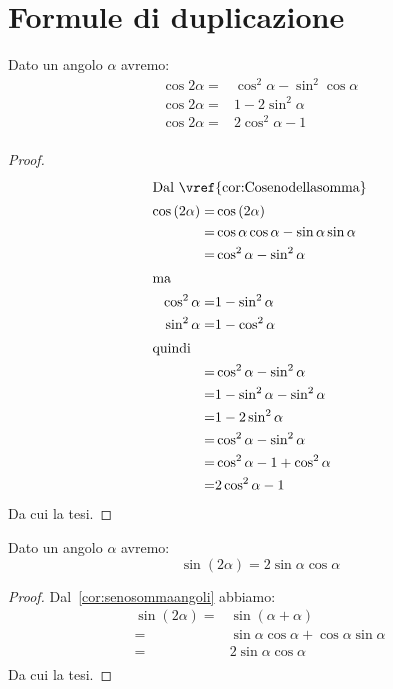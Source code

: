 \section{Formule di duplicazione}
\begin{thm}\label{thm:Formulediduplicazionecoseno}
Dato un angolo $\alpha$ avremo:
\begin{align*}
\cos 2\alpha=&\cos^2\alpha-\sin^2\cos\alpha\\
\cos 2\alpha=&1-2\sin^2\alpha\\
\cos 2\alpha=&2\cos^2\alpha-1\\
\end{align*}
\end{thm}
\begin{proof}
\begin{align*}
\intertext{Dal~\vref{cor:Cosenodellasomma}}
\cos\left(2\alpha\right)=&\cos\left(2\alpha\right)\\
=&\cos\alpha\cos\alpha-\sin\alpha\sin\alpha\\
=&\cos^2\alpha-\sin^2\alpha\\
\intertext{ma}
\cos^2\alpha=&1-\sin^2\alpha\\
\sin^2\alpha=&1-\cos^2\alpha\\
\intertext{quindi}
=&\cos^2\alpha-\sin^2\alpha\\
=&1-\sin^2\alpha-\sin^2\alpha\\
=&1-2\sin^2\alpha\\
=&\cos^2\alpha-\sin^2\alpha\\
=&\cos^2\alpha-1+\cos^2\alpha\\
=&2\cos^2\alpha-1\\
\end{align*}
Da cui la tesi.
\end{proof}
\begin{thm}\label{thm:Formulediduplicazioneseno}
	Dato un angolo $\alpha$ avremo:
	\[\sin\left(2\alpha\right)=2\sin\alpha\cos\alpha\]
\end{thm}
\begin{proof}
	Dal~\vref{cor:senosommaangoli} abbiamo:
	\begin{align*}
	\sin\left(2\alpha\right)=&\sin\left(\alpha+\alpha\right)\\
	=&\sin\alpha\cos\alpha+\cos\alpha\sin\alpha\\
	=&2\sin\alpha\cos\alpha\\
	\end{align*}
	Da cui la tesi.
\end{proof}
